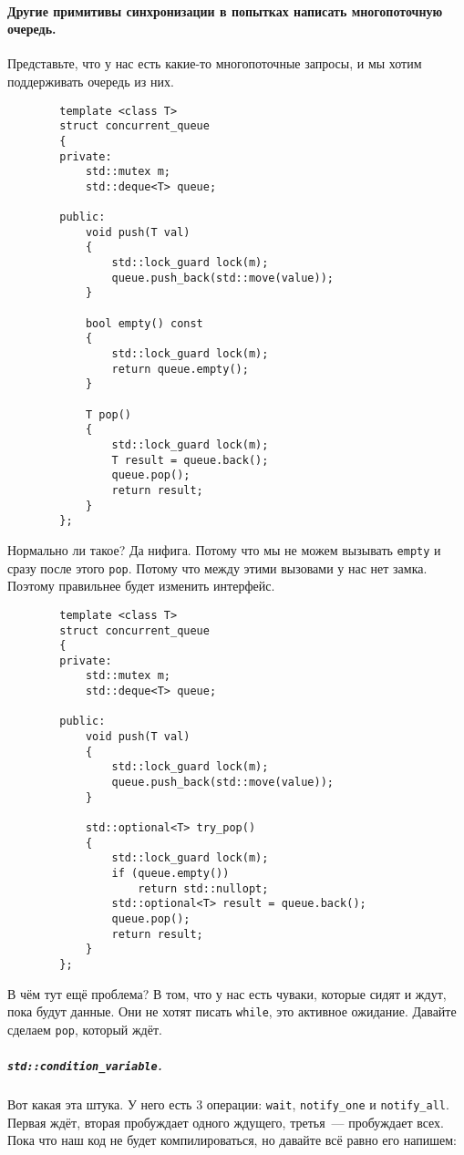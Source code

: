 \documentclass{article}
\begin{document}
    \paragraph{Другие примитивы синхронизации в попытках написать многопоточную очередь.}
    Представьте, что у нас есть какие-то многопоточные запросы, и мы хотим поддерживать очередь из них.
    \begin{verbatim}
        template <class T>
        struct concurrent_queue
        {
        private:
            std::mutex m;
            std::deque<T> queue;

        public:
            void push(T val)
            {
                std::lock_guard lock(m);
                queue.push_back(std::move(value));
            }

            bool empty() const
            {
                std::lock_guard lock(m);
                return queue.empty();
            }

            T pop()
            {
                std::lock_guard lock(m);
                T result = queue.back();
                queue.pop();
                return result;
            }
        };
    \end{verbatim}
    Нормально ли такое? Да нифига. Потому что мы не можем вызывать \texttt{empty} и сразу после этого \texttt{pop}. Потому что между этими вызовами у нас нет замка. Поэтому правильнее будет изменить интерфейс.
    \begin{verbatim}
        template <class T>
        struct concurrent_queue
        {
        private:
            std::mutex m;
            std::deque<T> queue;
            
        public:
            void push(T val)
            {
                std::lock_guard lock(m);
                queue.push_back(std::move(value));
            }

            std::optional<T> try_pop()
            {
                std::lock_guard lock(m);
                if (queue.empty())
                    return std::nullopt;
                std::optional<T> result = queue.back();
                queue.pop();
                return result;
            }
        };
    \end{verbatim}
    В чём тут ещё проблема? В том, что у нас есть чуваки, которые сидят и ждут, пока будут данные. Они не хотят писать \texttt{while}, это активное ожидание. Давайте сделаем \texttt{pop}, который ждёт.
    \subparagraph{\texttt{std::condition_variable}.}
    Вот какая эта штука. У него есть 3 операции: \texttt{wait}, \texttt{notify_one} и \texttt{notify_all}. Первая ждёт, вторая пробуждает одного ждущего, третья~--- пробуждает всех. Пока что наш код не будет компилироваться, но давайте всё равно его напишем:
\end{document}
